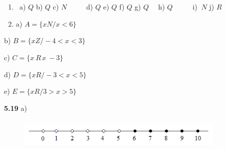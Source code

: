 \documentclass[12pt]{article}
\renewcommand{\_}{\kern-1.5pt\textunderscore\kern-1.5pt}
\begin{document}
\begin{enumerate}[label*={\fontsize{12pt}{12pt}\selectfont \textbf{\textit{\arabic*.}}}]
	\item \  a)  \( Q \) \tab b)  \( Q \) \tab c)\textbf{\textit{  \( N \) \ \ \ \  }}d)\textbf{\textit{  \( Q \) }}\tab e)\textbf{\textit{  \( Q \) }}\tab f)\textbf{\textit{  \( Q \)  \tab }} g)\textbf{\textit{  \( Q \) \tab }}\ \  h)  \( Q \) \tab \ \ \ \ \  i) \( ~N \) \tab j)\textbf{\textit{  \( R \) }}\par

\setlength{\parskip}{9.96pt}
	\item \textbf{\textit{ }} a)  \( A =  \{ x N/ x < 6 \}  \) 
\end{enumerate}\par

\setlength{\parskip}{8.04pt}
\begin{adjustwidth}{0.3in}{0.0in}
\tab  b)  \( B =  \{ x Z/ -4 < x < 3 \}  \) \par

\end{adjustwidth}

\begin{adjustwidth}{0.3in}{0.0in}
\tab  c)  \( C =  \{ x~R\frac{}{}x~ -3 \}  \) \par

\end{adjustwidth}

\begin{adjustwidth}{0.3in}{0.0in}
\tab  d)  \( D =  \{ x  R / -3 < x < 5 \}  \) \par

\end{adjustwidth}

\begin{adjustwidth}{0.3in}{0.0in}
\tab  e)  \( E =  \{ x  R / 3 > x> 5 \}  \) \par

\end{adjustwidth}


\vspace{\baselineskip}
\begin{adjustwidth}{0.3in}{0.0in}
\textbf{5.19}\textit{ } a)\par

\end{adjustwidth}




\begin{figure}[H]
	\begin{Center}
		\includegraphics[width=3.92in,height=0.58in]{./media/image17.png}
	\end{Center}
\end{figure}
\end{document}
